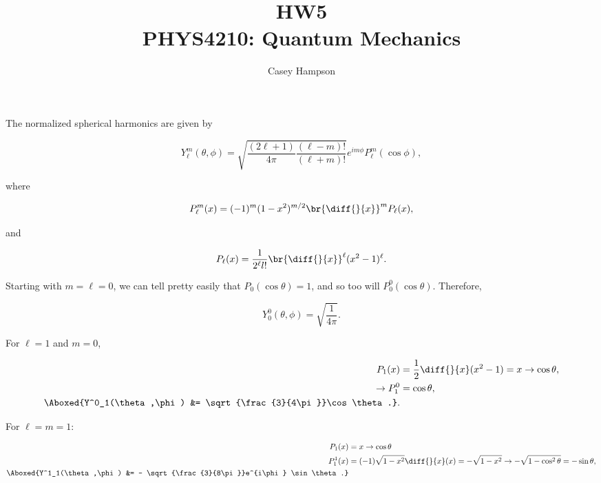 \documentclass[titlepage]{article}
\title{HW5 \\[5pt] PHYS4210: Quantum Mechanics}
\author{Casey Hampson}
\begin{document}
    \maketitle
    \pagebreak

    \section{}

    The normalized spherical harmonics are given by

    \begin{equation}
      Y^m_\ell (\theta,\phi) = \sqrt{\frac{(2\ell + 1)}{4\pi} \frac{(\ell - m)!}{(\ell + m)!} } e^{im\phi} P^m_\ell (\cos\phi),
    \end{equation}

    where 

    \begin{equation}
      P^m_\ell (x) = (-1)^m (1-x^2)^{m/2} \br{\diff{}{x}}^m P_\ell (x),
    \end{equation}

    and

    \begin{equation}
      P_\ell (x) = \frac{1}{2^\ell l!} \br{\diff{}{x}}^\ell (x^2 - 1)^\ell.
    \end{equation}

    Starting with $m=\ell=0$, we can tell pretty easily that $P_0(\cos\theta) = 1$, and so too will $P^0_0(\cos\theta)$. Therefore,

    \begin{equation}
      \boxed{Y^0_0(\theta,\phi) = \sqrt{\frac{1}{4\pi}}.}
    \end{equation}

    For $\ell=1$ and $m=0$,

    \begin{align}
      P_1(x) &= \frac{1}{2}\diff{}{x}(x^2-1) = x \rightarrow \cos\theta, \\
      \rightarrow P^0_1 &= \cos\theta, \\
      \Aboxed{Y^0_1(\theta,\phi) &= \sqrt{\frac{3}{4\pi}}\cos\theta.}.
    \end{align}

    For $\ell=m=1$:

    \begin{align}
      P_1(x) &= x \rightarrow \cos\theta \\
      P^1_1(x) &= (-1) \sqrt{1-x^2} \diff{}{x}(x) = -\sqrt{1-x^2} \rightarrow -\sqrt{1 - \cos^2\theta} = -\sin\theta, \\
      \Aboxed{Y^1_1(\theta,\phi) &= - \sqrt{\frac{3}{8\pi}}e^{i\phi} \sin\theta.}
    \end{align}
\end{document}
